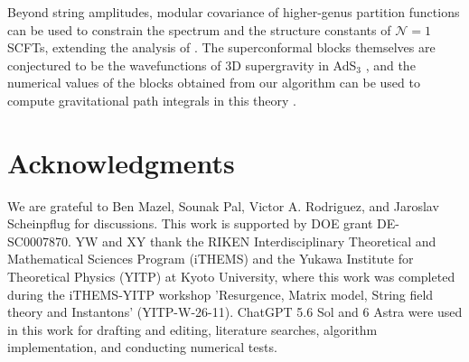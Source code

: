 \documentclass[12pt]{article}
\begin{document}
Beyond string amplitudes, modular covariance of higher-genus partition functions can be used to constrain the spectrum and the structure constants of $\mathcal{N}=1$ SCFTs, extending the analysis of \cite{Cho:2017fzo}. The superconformal blocks themselves are conjectured to be the wavefunctions of 3D  supergravity in AdS${}_3$ \cite{Eberhardt:2026hfh}, and the numerical values of the blocks obtained from our algorithm can be used to compute gravitational path integrals in this theory \cite{Bhattacharyya:2024vnw}.

\section*{Acknowledgments}

We are grateful to Ben Mazel, Sounak Pal, Victor A. Rodriguez, and Jaroslav Scheinpflug for discussions. This work is supported by DOE grant DE-SC0007870. YW and XY thank the RIKEN Interdisciplinary Theoretical and Mathematical Sciences Program (iTHEMS) and the Yukawa Institute for Theoretical Physics (YITP) at Kyoto University, where this work was completed during the iTHEMS-YITP workshop 'Resurgence, Matrix model, String field theory and Instantons' (YITP-W-26-11). ChatGPT 5.6 Sol and 6 Astra were used in this work for drafting and editing, literature searches, algorithm implementation, and conducting numerical tests. 
\end{document}
